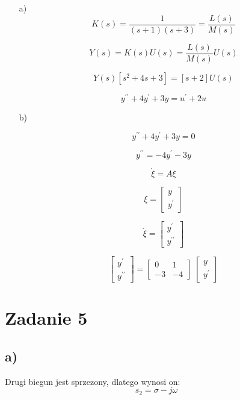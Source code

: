 \documentclass{article}
\begin{document}
\begin{enumerate}
    \item[a)] 
    $$ K(s) =  \frac{1}{(s+1)(s+3)} = \frac{L(s)}{M(s)} $$

    $$ Y(s) = K(s)U(s) = \frac{L(s)}{M(s)}U(s) $$

    $$Y(s)\left[s^{2}+4s+3\right]=[s+2]U(s)$$

    $$ y^{\prime\prime}+4y^{\prime}+3y=u^{\prime}+2u $$ 


    \item[b)] 

    $$ y^{\prime\prime}+4y^{\prime}+3y = 0 $$

    $$ y^{\prime\prime} = -4y^{\prime} - 3y $$

    $$ \dot{\xi} = A\xi$$

    $$ \xi = \begin{bmatrix}
        y \\
        y^{\prime}
        \end{bmatrix} $$

    $$ \dot{\xi} =  \begin{bmatrix}
        y^{\prime} \\
        y^{\prime\prime}
        \end{bmatrix}$$


    $$ \begin{bmatrix}
        y^{\prime} \\
        y^{\prime\prime}
        \end{bmatrix} = \begin{bmatrix}
            0 & 1\\
            -3 & -4
            \end{bmatrix}
        \;
        \begin{bmatrix}
            y \\
            y^{\prime}
            \end{bmatrix}   
             $$
    
\end{enumerate}

\newpage

\section*{Zadanie 5}


\subsection*{a)}
Drugi biegun jest sprzezony, dlatego wynosi on:
$$s_{2}=\sigma - j\omega$$
\end{document}
